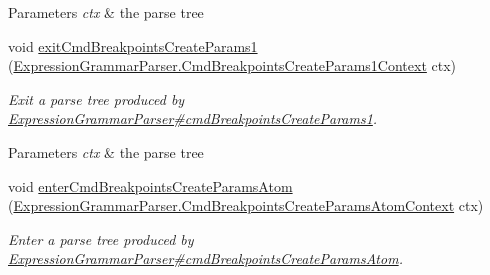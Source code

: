 \begin{DoxyCompactItemize}
\begin{DoxyCompactList}
\begin{DoxyParams}{Parameters}
{\em ctx} & the parse tree\\
\hline
\end{DoxyParams}
 \end{DoxyCompactList}\item 
void \hyperlink{classgov_1_1nasa_1_1jpf_1_1inspector_1_1server_1_1expression_1_1parser_1_1_expression_grammar_base_listener_a6ca5dda63a009cad4f02e415b4d26341}{exit\+Cmd\+Breakpoints\+Create\+Params1} (\hyperlink{classgov_1_1nasa_1_1jpf_1_1inspector_1_1server_1_1expression_1_1parser_1_1_expression_grammar_pa96543943a9acc7eb3cd37320a4fc3ee4}{Expression\+Grammar\+Parser.\+Cmd\+Breakpoints\+Create\+Params1\+Context} ctx)
\begin{DoxyCompactList}\small\item\em Exit a parse tree produced by \hyperlink{classgov_1_1nasa_1_1jpf_1_1inspector_1_1server_1_1expression_1_1parser_1_1_expression_grammar_parser_aa16584e37b631f4c0cdd1b148deda9df}{Expression\+Grammar\+Parser\#cmd\+Breakpoints\+Create\+Params1}.


\begin{DoxyParams}{Parameters}
{\em ctx} & the parse tree\\
\hline
\end{DoxyParams}
 \end{DoxyCompactList}\item 
void \hyperlink{classgov_1_1nasa_1_1jpf_1_1inspector_1_1server_1_1expression_1_1parser_1_1_expression_grammar_base_listener_a1e77ea04751764edcb27d83ec7b11941}{enter\+Cmd\+Breakpoints\+Create\+Params\+Atom} (\hyperlink{classgov_1_1nasa_1_1jpf_1_1inspector_1_1server_1_1expression_1_1parser_1_1_expression_grammar_paa3acc222754f42ff002c5d98d8d38136}{Expression\+Grammar\+Parser.\+Cmd\+Breakpoints\+Create\+Params\+Atom\+Context} ctx)
\begin{DoxyCompactList}\small\item\em Enter a parse tree produced by \hyperlink{classgov_1_1nasa_1_1jpf_1_1inspector_1_1server_1_1expression_1_1parser_1_1_expression_grammar_parser_af5febf5689be29b485c8497738ef35fc}{Expression\+Grammar\+Parser\#cmd\+Breakpoints\+Create\+Params\+Atom}.



\end{DoxyCompactList}
\end{DoxyCompactItemize}
